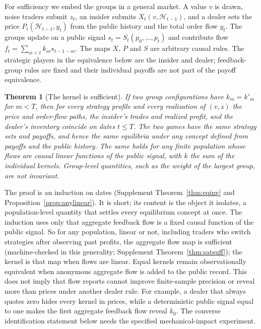 \documentclass[12pt]{article}
\newtheorem{theorem}{Theorem}[section]
\theoremstyle{definition}
\theoremstyle{remark}
\begin{document}
For sufficiency we embed the groups in a general market. A value $v$ is drawn, noise traders submit $z_t$, an insider submits $X_t(v,\mathcal H_{t-1})$, and a dealer sets the price $P_t(\mathcal H_{t-1},y_t)$ from the public history and the total order flow $y_t$. The groups update on a public signal $s_t=S_t(p_0,\ldots,p_t)$ and contribute flow $f_t=\sum_{m<t}k_ms_{t-1-m}$. The maps $X$, $P$ and $S$ are arbitrary causal rules. The strategic players in the equivalence below are the insider and dealer; feedback-group rules are fixed and their individual payoffs are not part of the payoff equivalence.

\begin{theorem}[The kernel is sufficient]\label{n:suff}
If two group configurations have $k_m=k'_m$ for $m<T$, then for every strategy profile and every realization of $(v,z)$ the price and order-flow paths, the insider's trades and realized profit, and the dealer's inventory coincide on dates $t\le T$. The two games have the same strategy sets and payoffs, and hence the same equilibria under any concept defined from payoffs and the public history. The same holds for any finite population whose flows are causal linear functions of the public signal, with $k$ the sum of the individual kernels. Group-level quantities, such as the weight of the largest group, are not invariant.
\end{theorem}

The proof is an induction on dates (Supplement Theorem~\ref{thm:eqinv} and Proposition~\ref{prop:anylinear}). It is short; its content is the object it isolates, a population-level quantity that settles every equilibrium concept at once. The induction uses only that aggregate feedback flow is a fixed causal function of the public signal. So for any population, linear or not, including traders who switch strategies after observing past profits, the aggregate flow map is sufficient (machine-checked in this generality; Supplement Theorem~\ref{thm:satsuff}); the kernel is that map when flows are linear. Equal kernels remain observationally equivalent when anonymous aggregate flow is added to the public record. This does not imply that flow reports cannot improve finite-sample precision or reveal more than prices under another dealer rule. For example, a dealer that always quotes zero hides every kernel in prices, while a deterministic public signal equal to one makes the first aggregate feedback flow reveal $k_0$. The converse identification statement below needs the specified mechanical-impact experiment.
\end{document}
